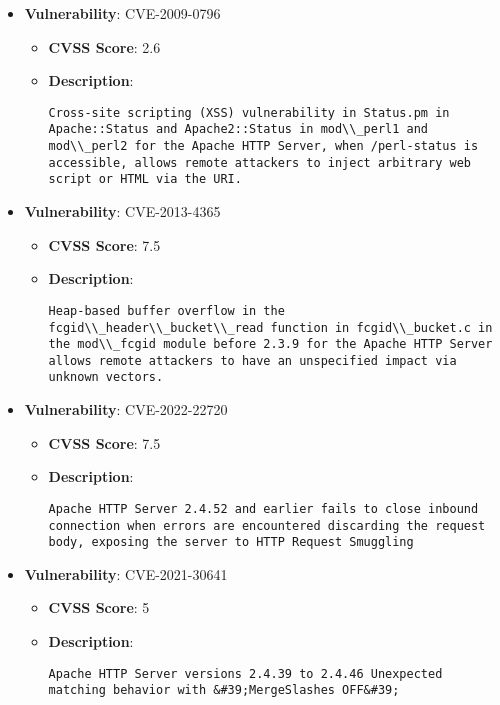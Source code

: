 \documentclass{article}
\begin{document}
\begin{itemize}
        \item \textbf{Vulnerability}: CVE-2009-0796
        \begin{itemize}
            \item \textbf{CVSS Score}:  2.6 
            \item \textbf{Description}:
            \parbox[t]{0.9\linewidth}{
                \verb|Cross-site scripting (XSS) vulnerability in Status.pm in Apache::Status and Apache2::Status in mod\\_perl1 and mod\\_perl2 for the Apache HTTP Server, when /perl-status is accessible, allows remote attackers to inject arbitrary web script or HTML via the URI.|
            }
        \end{itemize}
    
        \item \textbf{Vulnerability}: CVE-2013-4365
        \begin{itemize}
            \item \textbf{CVSS Score}:  7.5 
            \item \textbf{Description}:
            \parbox[t]{0.9\linewidth}{
                \verb|Heap-based buffer overflow in the fcgid\\_header\\_bucket\\_read function in fcgid\\_bucket.c in the mod\\_fcgid module before 2.3.9 for the Apache HTTP Server allows remote attackers to have an unspecified impact via unknown vectors.|
            }
        \end{itemize}
    
        \item \textbf{Vulnerability}: CVE-2022-22720
        \begin{itemize}
            \item \textbf{CVSS Score}:  7.5 
            \item \textbf{Description}:
            \parbox[t]{0.9\linewidth}{
                \verb|Apache HTTP Server 2.4.52 and earlier fails to close inbound connection when errors are encountered discarding the request body, exposing the server to HTTP Request Smuggling|
            }
        \end{itemize}
    
        \item \textbf{Vulnerability}: CVE-2021-30641
        \begin{itemize}
            \item \textbf{CVSS Score}:  5 
            \item \textbf{Description}:
            \parbox[t]{0.9\linewidth}{
                \verb|Apache HTTP Server versions 2.4.39 to 2.4.46 Unexpected matching behavior with &#39;MergeSlashes OFF&#39;|
            }
        \end{itemize}
    

\end{itemize}
\end{document}
